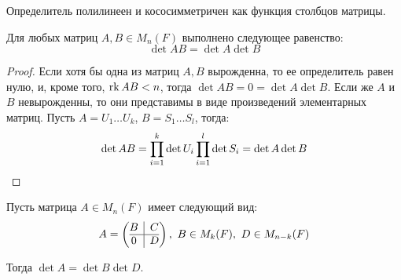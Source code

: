     \begin{note}
    	Определитель полилинеен и кососимметричен как функция столбцов матрицы.
    \end{note}
    
    \begin{theorem}
    	Для любых матриц $A, B \in M_n(F)$ выполнено следующее равенство:
    	\[\det{AB} = \det{A}\det{B}\]
    \end{theorem}
    
    \begin{proof}
    	Если хотя бы одна из матриц $A, B$ вырожденна, то ее определитель равен нулю, и, кроме того, $\rk{AB} \hm{<} n$, тогда $\det{AB} = 0 = \det{A}\det{B}$. Если же $A$ и $B$ невырожденны, то они представимы в виде произведений элементарных матриц. Пусть $A = U_1\dots U_k$, $B = S_1\dots S_l$, тогда:
    	\[\det{AB} = \prod_{i = 1}^{k}\det{U_i}\prod_{i = 1}^{l}\det{S_i} = \det{A}\det{B}\qedhere\]
    \end{proof}
    
    \begin{theorem}
    	Пусть матрица $A \in M_n(F)$ имеет следующий вид:
    	\[A = \left(\begin{array}{@{}c|c@{}}
    		B & C\\
    		\hline
    		0 & D
    	\end{array}\right),~B \in M_k(F),~D \in M_{n - k}(F)\]
    	
    	Тогда $\det{A} = \det{B}\det{D}$.
    \end{theorem}
    
